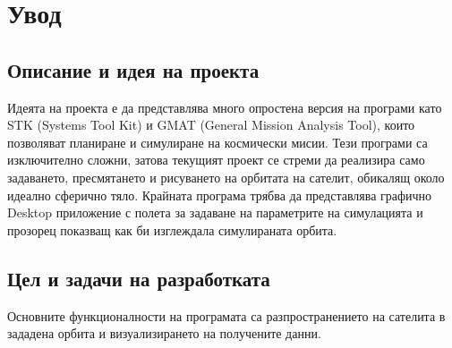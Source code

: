 \graphicspath{ {./chapter1/images/} }

\chapter{Увод}


\section{Описание и идея на проекта}

Идеята на проекта е да представлява много опростена версия на програми като
STK (Systems Tool Kit) и GMAT (General Mission Analysis Tool), които позволяват
планиране и симулиране на космически мисии. Тези програми са изключително
сложни, затова текущият проект се стреми да реализира само задаването,
пресмятането и рисуването на орбитата на сателит, обикалящ около идеално
сферично тяло. Крайната програма трябва да представлява графично Desktop
приложение с полета за задаване на параметрите на симулацията и прозорец
показващ как би изглеждала симулираната орбита.


\section{Цел и задачи на разработката}

Основните функционалности на програмата са разпространението на сателита в
зададена орбита и визуализирането на получените данни.






